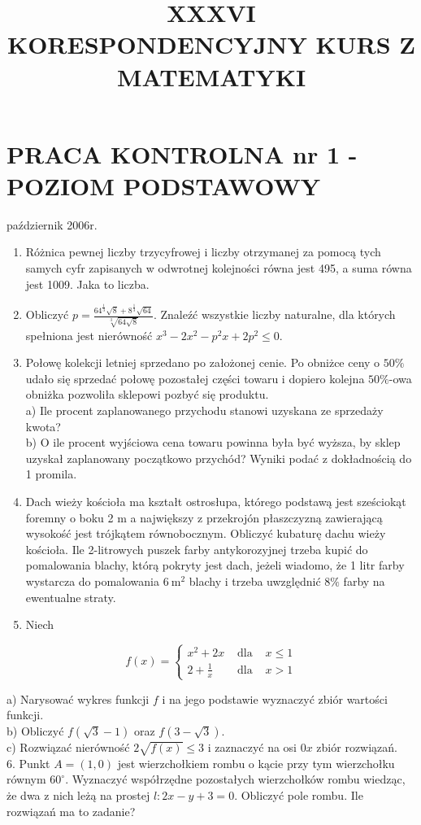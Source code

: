 \documentclass[10pt]{article}
\title{XXXVI \\
 KORESPONDENCYJNY KURS Z MATEMATYKI }
\author{}
\date{}
\begin{document}
\maketitle
\section*{PRACA KONTROLNA nr 1 - POZIOM PODSTAWOWY}
październik 2006r.

\begin{enumerate}
  \item Różnica pewnej liczby trzycyfrowej i liczby otrzymanej za pomocą tych samych cyfr zapisanych w odwrotnej kolejności równa jest 495, a suma równa jest 1009. Jaka to liczba.
  \item Obliczyć $p=\frac{64^{\frac{1}{3}} \sqrt{8}+8^{\frac{1}{3}} \sqrt{64}}{\sqrt[3]{64 \sqrt{8}}}$. Znaleźć wszystkie liczby naturalne, dla których spełniona jest nierówność $x^{3}-2 x^{2}-p^{2} x+2 p^{2} \leqslant 0$.
  \item Połowę kolekcji letniej sprzedano po założonej cenie. Po obniżce ceny o $50 \%$ udało się sprzedać połowę pozostałej części towaru i dopiero kolejna $50 \%$-owa obniżka pozwoliła sklepowi pozbyć się produktu.\\
a) Ile procent zaplanowanego przychodu stanowi uzyskana ze sprzedaży kwota?\\
b) O ile procent wyjściowa cena towaru powinna była być wyższa, by sklep uzyskał zaplanowany początkowo przychód? Wyniki podać z dokładnością do 1 promila.
  \item Dach wieży kościoła ma kształt ostrosłupa, którego podstawą jest sześciokąt foremny o boku 2 m a największy z przekrojón płaszczyzną zawierającą wysokość jest trójkątem równobocznym. Obliczyć kubaturę dachu wieży kościoła. Ile 2-litrowych puszek farby antykorozyjnej trzeba kupić do pomalowania blachy, którą pokryty jest dach, jeżeli wiadomo, że 1 litr farby wystarcza do pomalowania $6 \mathrm{~m}^{2}$ blachy i trzeba uwzględnić $8 \%$ farby na ewentualne straty.
  \item Niech
\end{enumerate}

$$
f(x)=\left\{\begin{array}{rrr}
x^{2}+2 x & \text { dla } & x \leqslant 1 \\
2+\frac{1}{x} & \text { dla } & x>1
\end{array}\right.
$$

a) Narysować wykres funkcji $f$ i na jego podstawie wyznaczyć zbiór wartości funkcji.\\
b) Obliczyć $f(\sqrt{3}-1)$ oraz $f(3-\sqrt{3})$.\\
c) Rozwiązać nierówność $2 \sqrt{f(x)} \leqslant 3$ i zaznaczyć na osi $0 x$ zbiór rozwiązań.\\
6. Punkt $A=(1,0)$ jest wierzchołkiem rombu o kącie przy tym wierzchołku równym $60^{\circ}$. Wyznaczyć współrzędne pozostałych wierzchołków rombu wiedząc, że dwa z nich leżą na prostej $l: 2 x-y+3=0$. Obliczyć pole rombu. Ile rozwiązań ma to zadanie?
\end{document}
